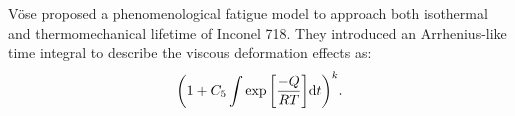 V\"{o}se \cite{Vose2013} proposed a phenomenological fatigue model to approach both isothermal and thermomechanical lifetime of Inconel 718. They introduced an Arrhenius-like time integral to describe the viscous deformation effects as:
\begin{equation}
{\left( {1 + {C_5}\int {\exp \left[ {\frac{{ - Q}}{{RT}}} \right]} {\rm{d}}t} \right)^k}.
\end{equation}


